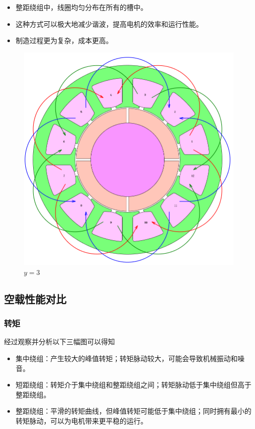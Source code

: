 \documentclass{thuemp}
\begin{document}
\begin{itemize}
	\item 整距绕组中，线圈均匀分布在所有的槽中。
	\item 这种方式可以极大地减少谐波，提高电机的效率和运行性能。
	\item 制造过程更为复杂，成本更高。
\end{itemize}
\begin{figure}[H]
  \centering
  \includegraphics[width=1\linewidth]{./img/task2/model3.png}
  \caption{$y=3$}
\end{figure}

\subsection{空载性能对比}

\subsubsection{转矩}
经过观察并分析以下三幅图可以得知
\begin{itemize}
	\item 集中绕组：产生较大的峰值转矩；转矩脉动较大，可能会导致机械振动和噪音。
	\item 短距绕组：转矩介于集中绕组和整距绕组之间；转矩脉动低于集中绕组但高于整距绕组。
	\item 整距绕组：平滑的转矩曲线，但峰值转矩可能低于集中绕组；同时拥有最小的转矩脉动，可以为电机带来更平稳的运行。
\end{itemize}
\end{document}
